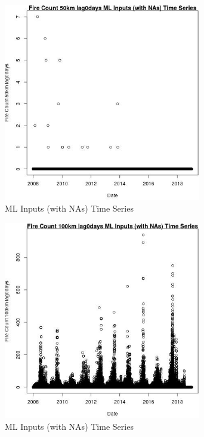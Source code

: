 \begin{figure} 
\centering  
\includegraphics[width=0.77\textwidth]{Code_Outputs/Report_ML_input_PM25_Step4_part_e_de_duplicated_aves_compiled_2019-05-21wNAs_Fire_Count_50km_lag0daysvDate.jpg} 
\caption{\label{fig:Report_ML_input_PM25_Step4_part_e_de_duplicated_aves_compiled_2019-05-21wNAsFire_Count_50km_lag0daysvDate}ML Inputs (with NAs) Time Series} 
\end{figure} 
 

\clearpage 

\begin{figure} 
\centering  
\includegraphics[width=0.77\textwidth]{Code_Outputs/Report_ML_input_PM25_Step4_part_e_de_duplicated_aves_compiled_2019-05-21wNAs_Fire_Count_100km_lag0daysvDate.jpg} 
\caption{\label{fig:Report_ML_input_PM25_Step4_part_e_de_duplicated_aves_compiled_2019-05-21wNAsFire_Count_100km_lag0daysvDate}ML Inputs (with NAs) Time Series} 
\end{figure} 
 

